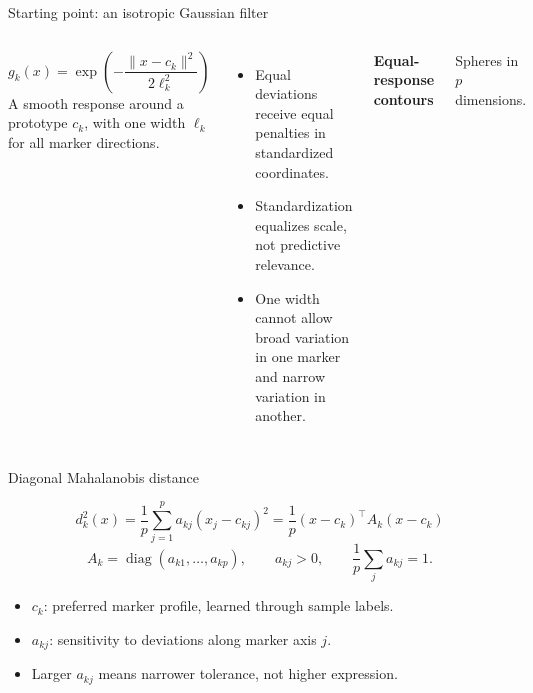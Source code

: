 \begin{frame}{Starting point: an isotropic Gaussian filter}

\begin{columns}[T,onlytextwidth]
\[g_k(x)=\exp\!\left(-\frac{\|x-c_k\|^2}{2\ell_k^2}\right)\]
A smooth response around a prototype $c_k$, with one width $\ell_k$ for all marker directions.
\begin{itemize}
\item Equal deviations receive equal penalties in standardized coordinates.
\item Standardization equalizes scale, not predictive relevance.
\item One width cannot allow broad variation in one marker and narrow variation in another.
\end{itemize}
\centering
\textbf{Equal-response contours}\par
{}\par\small Spheres in $p$ dimensions.
\end{columns}

\end{frame}

\begin{frame}{Diagonal Mahalanobis distance}

\[\boxed{d_k^2(x)=\frac1p\sum_{j=1}^p a_{kj}(x_j-c_{kj})^2
=\frac1p(x-c_k)^\top A_k(x-c_k)}\]
\[A_k=\operatorname{diag}(a_{k1},\ldots,a_{kp}),\qquad a_{kj}>0,\qquad \frac1p\sum_j a_{kj}=1.\]
\begin{itemize}
\item $c_k$: preferred marker profile, learned through sample labels.
\item $a_{kj}$: sensitivity to deviations along marker axis $j$.
\item Larger $a_{kj}$ means narrower tolerance, not higher expression.
\end{itemize}

\end{frame}

